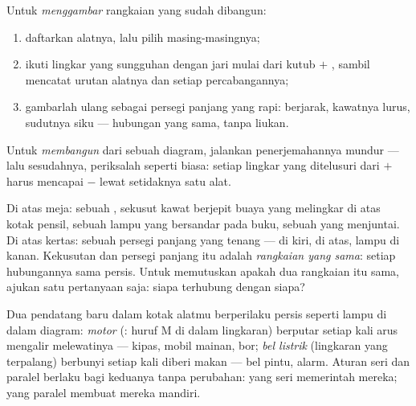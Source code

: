 \begin{method}\label{met:g6:circuits-and-safety:translate}
Untuk \emph{menggambar} rangkaian yang sudah dibangun:
\begin{enumerate}
  \item daftarkan alatnya, lalu pilih  masing-masingnya;
  \item ikuti lingkar yang sungguhan dengan jari mulai dari kutub $+$
        , sambil mencatat urutan alatnya dan setiap
        percabangannya;
  \item gambarlah ulang sebagai persegi panjang yang rapi: 
        berjarak, kawatnya lurus, sudutnya siku --- hubungan yang
        sama, tanpa liukan.
\end{enumerate}
Untuk \emph{membangun} dari sebuah diagram, jalankan penerjemahannya
mundur --- lalu sesudahnya, periksalah seperti biasa: setiap lingkar
yang ditelusuri dari $+$ harus mencapai $-$ lewat setidaknya satu alat.
\end{method}

\begin{example}\label{ex:g6:circuits-and-safety:portraits}
Di atas meja: sebuah , sekusut kawat berjepit buaya yang
melingkar di atas kotak pensil, sebuah lampu yang bersandar pada buku,
sebuah  yang menjuntai. Di atas kertas: sebuah persegi panjang
yang tenang ---  di kiri,  di atas, lampu di kanan.
Kekusutan dan persegi panjang itu adalah \emph{rangkaian yang sama}:
setiap hubungannya sama persis. Untuk memutuskan apakah dua rangkaian
itu sama, ajukan satu pertanyaan saja: siapa terhubung dengan siapa?
\end{example}

\begin{example}\label{ex:g6:circuits-and-safety:motor}
Dua pendatang baru dalam kotak alatmu berperilaku persis seperti lampu
di dalam diagram: \emph{motor} (: huruf M di dalam
lingkaran) berputar setiap kali arus mengalir melewatinya --- kipas,
mobil mainan, bor; \emph{bel listrik} (lingkaran
yang terpalang) berbunyi setiap kali diberi makan --- bel pintu,
alarm. Aturan seri dan paralel berlaku bagi keduanya tanpa perubahan:
 yang seri memerintah mereka;  yang paralel membuat
mereka mandiri.
\end{example}

